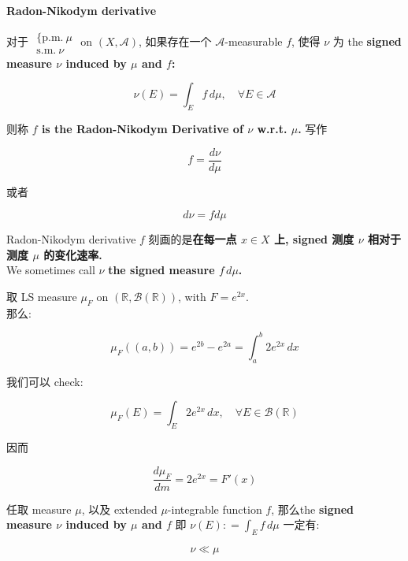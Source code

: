 \documentclass{qlnotes-export}
\begin{document}
\begin{definition}{\protect{}\label{kn-radon-nikodym-derivative}{\textbf{Radon-Nikodym
derivative}}}

对于 \(\begin{matrix}
{\{\text{p.m.}\ \mu} \\
{\text{s.m.}\ \nu}
\end{matrix}\) on \((X,\mathcal{A})\), 如果存在一个 \(\mathcal{A}\)-measurable \(f\), 使得 \(\nu\) 为 the \textbf{signed measure \(\nu\) induced by \(\mu\) and \(f\):}

\[\nu(E) = \int_{E}f\, d\mu,\quad\forall E \in \mathcal{A}\]

则称 \textbf{\(f\) is the Radon-Nikodym Derivative of \(\nu\) w.r.t. \(\mu\).} 写作

\[f = \frac{d\nu}{d\mu}\]

或者

\[d\nu = fd\mu\]

\end{definition}

Radon-Nikodym derivative \(f\) 刻画的是\textbf{在每一点 \(x \in X\) 上, signed 测度 \(\nu\) 相对于测度 \(\mu\) 的变化速率.}\\
We sometimes call \(\nu\) \textbf{the signed measure \(f\, d\mu\).}\\

\begin{example}

取 LS measure \(\mu_{F}\) on \(({\mathbb{R}},\mathcal{B}({\mathbb{R}}))\), with \(F = e^{2x}\).\\
那么:

\[\mu_{F}((a,b)) = e^{2b} - e^{2a} = \int_{a}^{b}2e^{2x}\, dx\]

我们可以 check:

\[\mu_{F}(E) = \int_{E}2e^{2x}\, dx,\quad\forall E \in \mathcal{B}({\mathbb{R}})\]

因而

\[\frac{d\mu_{F}}{dm} = 2e^{2x} = F'(x)\]

\end{example}

\begin{proposition}

任取 measure \(\mu\), 以及 extended \(\mu\)-integrable function \(f\), 那么the \textbf{signed measure \(\nu\) induced by \(\mu\) and \(f\)} 即 \(\nu(E): = \int_{E}f\, d\mu\) 一定有:

\[\nu \ll \mu\]

\end{proposition}
\end{document}
